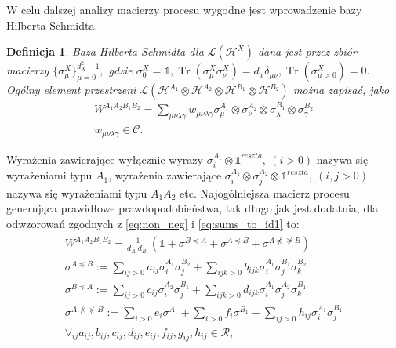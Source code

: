\documentclass[10pt]{article} %
\newtheorem{definicja}{Definicja}
\DeclareMathOperator{\Trs}{Tr}
\newcommand{\Mats}[1]{\mathcal{L}(#1)}
\newcommand{\Hx}[1]{\mathcal{H}^{#1}}
\newcommand{\LHx}[1]{\Mats{\Hx{#1}}}
\newcommand{\Tr}[1]{\Trs(#1)}
\newcommand{\WAll}{W^{A_1A_2B_1B_2}}
\begin{document}
W celu dalszej analizy macierzy procesu wygodne jest wprowadzenie bazy Hilberta-Schmidta.
\begin{definicja}
Baza Hilberta-Schmidta dla $\LHx{X}$ dana jest przez zbiór macierzy $\{\sigma^X_\mu\}^{d^2_X-1}_{\mu=0},$ gdzie $\sigma^X_0 = \mathbb{1}, \Tr{\sigma^X_\mu\sigma^X_\nu}=d_x\delta_{\mu\nu}, \Tr{\sigma^X_{\mu>0}}=0.$ Ogólny element przestrzeni $\Mats{\Hx{A_1}\otimes\Hx{A_2}\otimes\Hx{B_1}\otimes\Hx{B_2}}$ można zapisać, jako
\begin{gather}
\WAll = \sum_{\mu\nu\lambda\gamma} w_{\mu\nu\lambda\gamma} \sigma_\mu^{A_1}\otimes\sigma_\nu^{A_2}\otimes\sigma_\lambda^{B_1}\otimes\sigma_\gamma^{B_2} \\
w_{\mu\nu\lambda\gamma} \in \mathcal{C} \nonumber.
\end{gather}
\end{definicja}
Wyrażenia zawierające wyłącznie wyrazy $\sigma^{A_1}_i \otimes \mathbb{1}^{reszta},~(i > 0)$ nazywa się wyrażeniami typu $A_1$, wyrażenia zawierające  $\sigma^{A_1}_i \otimes \sigma^{A_2}_j \otimes \mathbb{1}^{reszta},~(i, j > 0)$ nazywa się wyrażeniami typu $A_1A_2$ etc.
Najogólniejsza macierz procesu generująca prawidłowe prawdopodobieństwa, tak długo jak jest dodatnia, dla odwzorowań zgodnych z \eqref{eq:non_neg} i \eqref{eq:sums_to_id1} to:
\begin{gather}
\label{eq:genw}
\begin{gathered}
\WAll = \frac{1}{d_{A_1}d_{B_1}}(\mathbb{1} +\sigma^{B \preceq A} + \sigma^{A \preceq B} + \sigma^{A \npreceq \nsucceq B}) \\
\sigma^{A \preceq B} := \sum_{ij>0} a_{ij} \sigma^{A_1}_i \sigma^{B_2}_j + \sum_{ijk>0} b_{ijk} \sigma^{A_1}_i \sigma^{B_1}_j \sigma^{B_2}_k \\
\sigma^{B \preceq A} := \sum_{ij>0} c_{ij} \sigma^{A_2}_i \sigma^{B_1}_j + \sum_{ijk>0} d_{ijk} \sigma^{A_1}_i \sigma^{A_2}_j \sigma^{B_1}_k \\
 \sigma^{A \nprec \nsucc B} := \sum_{i>0} e_i  \sigma^{A_1} + \sum_{i>0} f_i  \sigma^{B_1} + \sum_{ij>0} h_{ij} \sigma^{A_1}_i \sigma^{B_1}_j \\
 \forall_{ij} a_{ij}, b_{ij}, c_{ij}, d_{ij}, e_{ij}, f_{ij}, g_{ij}, h_{ij} \in \mathcal{R},
\end{gathered}
\end{gather}
\end{document}
